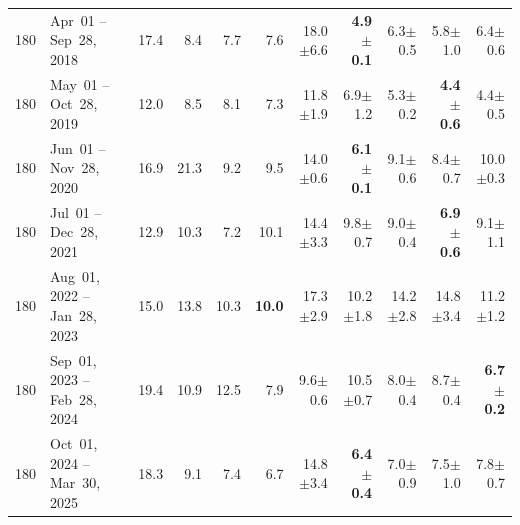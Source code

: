 \begin{longtable}{r l r r r r r r r r r}
180 & Apr~01 -- Sep~28, 2018 & 17.4 & 8.4 & 7.7 & 7.6 & 18.0{\tiny$\pm$6.6} & \textbf{4.9{\tiny$\pm$0.1}} & 6.3{\tiny$\pm$0.5} & 5.8{\tiny$\pm$1.0} & 6.4{\tiny$\pm$0.6} \\
180 & May~01 -- Oct~28, 2019 & 12.0 & 8.5 & 8.1 & 7.3 & 11.8{\tiny$\pm$1.9} & 6.9{\tiny$\pm$1.2} & 5.3{\tiny$\pm$0.2} & \textbf{4.4{\tiny$\pm$0.6}} & 4.4{\tiny$\pm$0.5} \\
180 & Jun~01 -- Nov~28, 2020 & 16.9 & 21.3 & 9.2 & 9.5 & 14.0{\tiny$\pm$0.6} & \textbf{6.1{\tiny$\pm$0.1}} & 9.1{\tiny$\pm$0.6} & 8.4{\tiny$\pm$0.7} & 10.0{\tiny$\pm$0.3} \\
180 & Jul~01 -- Dec~28, 2021 & 12.9 & 10.3 & 7.2 & 10.1 & 14.4{\tiny$\pm$3.3} & 9.8{\tiny$\pm$0.7} & 9.0{\tiny$\pm$0.4} & \textbf{6.9{\tiny$\pm$0.6}} & 9.1{\tiny$\pm$1.1} \\
180 & Aug~01, 2022 -- Jan~28, 2023 & 15.0 & 13.8 & 10.3 & \textbf{10.0} & 17.3{\tiny$\pm$2.9} & 10.2{\tiny$\pm$1.8} & 14.2{\tiny$\pm$2.8} & 14.8{\tiny$\pm$3.4} & 11.2{\tiny$\pm$1.2} \\
180 & Sep~01, 2023 -- Feb~28, 2024 & 19.4 & 10.9 & 12.5 & 7.9 & 9.6{\tiny$\pm$0.6} & 10.5{\tiny$\pm$0.7} & 8.0{\tiny$\pm$0.4} & 8.7{\tiny$\pm$0.4} & \textbf{6.7{\tiny$\pm$0.2}} \\
180 & Oct~01, 2024 -- Mar~30, 2025 & 18.3 & 9.1 & 7.4 & 6.7 & 14.8{\tiny$\pm$3.4} & \textbf{6.4{\tiny$\pm$0.4}} & 7.0{\tiny$\pm$0.9} & 7.5{\tiny$\pm$1.0} & 7.8{\tiny$\pm$0.7} \\
\end{longtable}
\endgroup



